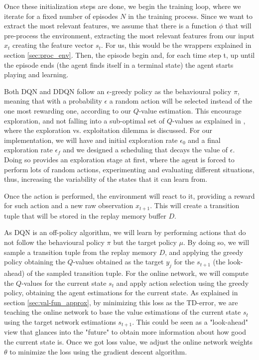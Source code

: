 Once these initialization steps are done, we begin the training loop, where we iterate for a fixed number of episodes $N$ in the training process. Since we want to extract the most relevant features, we assume that there is a function $\phi$ that will pre-process the environment, extracting the most relevant features from our input $x_t$ creating the feature vector $s_t$. For us, this would be the wrappers explained in section \ref{sec:proc_env}. Then, the episode begin and, for each time step t, up until the episode ends (the agent finds itself in a terminal state) the agent starts playing and learning.

Both DQN and DDQN follow an $\epsilon$-greedy policy as the behavioural policy $\pi$, meaning that with a probability $\epsilon$ a random action will be selected instead of the one most rewarding one, according to our $Q$-value estimation. This encourage exploration, and not falling into a sub-optimal set of $Q$-values as explained in \cite{exploitation_vs_exploration}, where the exploration vs. exploitation dilemma is discussed. For our implementation, we will have and initial exploration rate $\epsilon_0$ and a final exploration rate $\epsilon_f$ and we designed a scheduling that decays the value of $\epsilon$. Doing so provides an exploration stage at first, where the agent is forced to perform lots of random actions, experimenting and evaluating different situations, thus, increasing the variability of the states that it can learn from.

Once the action is performed, the environment will react to it, providing a reward for such action and a new raw observation $x_{t+1}$. This will create a transition tuple that will be stored in the replay memory buffer $D$. 

As DQN is an off-policy algorithm, we will learn by performing actions that do not follow the behavioural policy $\pi$ but the target policy $\mu$. By doing so, we will sample a transition tuple from the replay memory $D$, and applying the greedy policy obtaining the $Q$-values obtained as the target $y_j$ for the $s_{t+1}$ (the look-ahead) of the sampled transition tuple. For the online network, we will compute the $Q$-values for the current state $s_t$ and apply action selection using the greedy policy, obtaining the agent estimations for the current state. As explained in section \ref{sec:val-fun_approx}, by minimizing this loss as the TD-error, we are teaching the online network to base the value estimations of the current state $s_t$ using the target network estimations $s_{t+1}$. This could be seen as a "look-ahead" view that glances into the "future" to obtain more information about how good the current state is. Once we got loss value, we adjust the online network weights $\theta$ to minimize the loss using the gradient descent algorithm. 

